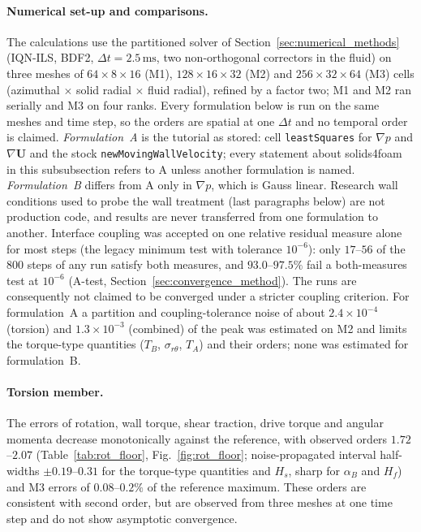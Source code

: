 \paragraph{Numerical set-up and comparisons.}
The calculations use the partitioned solver of Section~\ref{sec:numerical_methods} (IQN-ILS, BDF2, $\Delta t=2.5\,\mathrm{ms}$, two non-orthogonal correctors in the fluid) on three meshes of $64\times8\times16$ (M1), $128\times16\times32$ (M2) and $256\times32\times64$ (M3) cells (azimuthal $\times$ solid radial $\times$ fluid radial), refined by a factor two; M1 and M2 ran serially and M3 on four ranks.
Every formulation below is run on the same meshes and time step, so the orders are spatial at one $\Delta t$ and no temporal order is claimed.
\emph{Formulation~A} is the tutorial as stored: cell \texttt{leastSquares} for $\nabla p$ and $\nabla\mathbf{U}$ and the stock \texttt{newMovingWallVelocity}; every statement about solids4foam in this subsubsection refers to A unless another formulation is named.
\emph{Formulation~B} differs from A only in $\nabla p$, which is Gauss linear.
Research wall conditions used to probe the wall treatment (last paragraphs below) are not production code, and results are never transferred from one formulation to another.
Interface coupling was accepted on one relative residual measure alone for most steps (the legacy minimum test with tolerance $10^{-6}$): only $17$--$56$ of the 800 steps of any run satisfy both measures, and $93.0$--$97.5\%$ fail a both-measures test at $10^{-6}$ (A-test, Section~\ref{sec:convergence_method}).
The runs are consequently not claimed to be converged under a stricter coupling criterion. For formulation~A a partition and coupling-tolerance noise of about $2.4\times10^{-4}$ (torsion) and $1.3\times10^{-3}$ (combined) of the peak was estimated on M2 and limits the torque-type quantities ($T_B$, $\sigma_{r\theta}$, $T_A$) and their orders; none was estimated for formulation~B.

\paragraph{Torsion member.}
The errors of rotation, wall torque, shear traction, drive torque and angular momenta decrease monotonically against the reference, with observed orders $1.72$--$2.07$ (Table~\ref{tab:rot_floor}, Fig.~\ref{fig:rot_floor}; noise-propagated interval half-widths $\pm0.19$--$0.31$ for the torque-type quantities and $H_s$, sharp for $\alpha_B$ and $H_f$) and M3 errors of $0.08$--$0.2\%$ of the reference maximum.
These orders are consistent with second order, but are observed from three meshes at one time step and do not show asymptotic convergence.

